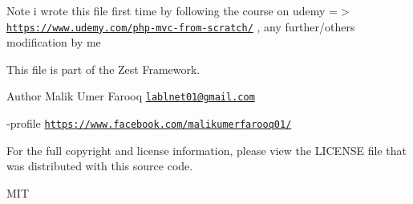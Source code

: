 \begin{DoxyNote}{Note}
i wrote this file first time by following the course on udemy =$>$ \href{https://www.udemy.com/php-mvc-from-scratch/}{\tt https\+://www.\+udemy.\+com/php-\/mvc-\/from-\/scratch/} , any further/others modification by me
\end{DoxyNote}
This file is part of the Zest Framework.

\begin{DoxyAuthor}{Author}
Malik Umer Farooq \href{mailto:lablnet01@gmail.com}{\tt lablnet01@gmail.\+com} 

-\/profile \href{https://www.facebook.com/malikumerfarooq01/}{\tt https\+://www.\+facebook.\+com/malikumerfarooq01/}
\end{DoxyAuthor}
For the full copyright and license information, please view the L\+I\+C\+E\+N\+SE file that was distributed with this source code.

M\+IT 